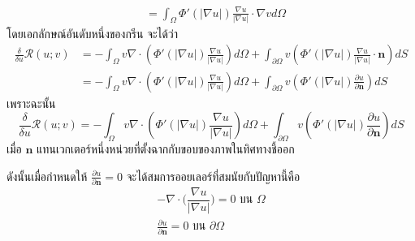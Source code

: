 \begin{Example}
\begin{align*}
    &= \int_{\Omega}\Phi'(|\nabla u|) \frac{\nabla u}{|\nabla u|} \cdot \nabla v d\Omega
    \end{align*}
    โดยเอกลักษณ์อันดับหนึ่งของกรีน จะได้ว่า
    \begin{align*}
    \frac{\delta}{\delta u}\mathcal{R}(u;v) &= - \int_{\Omega}^{} v \nabla \cdot \left(\Phi'(|\nabla u|) \frac{\nabla u}{|\nabla u|} \right)d\Omega + \int_{\partial \Omega}^{} v \left(\Phi'(|\nabla u|) \frac{\nabla u}{|\nabla u|} \cdot \boldsymbol{n}\right) dS \\
    &= -\int_{\Omega}^{} v \nabla \cdot \left(\Phi'(|\nabla u|) \frac{\nabla u}{|\nabla u|} \right)d\Omega + \int_{\partial \Omega}^{} v \left(\Phi'(|\nabla u|)  \frac{\partial u}{\partial \boldsymbol{n}}\right) dS
    \end{align*}
    เพราะฉะนั้น  
    \[
    \frac{\delta}{\delta u}\mathcal{R}(u;v) = -\int_{\Omega}^{} v \nabla \cdot \left(\Phi'(|\nabla u|) \frac{\nabla u}{|\nabla u|} \right)d\Omega + \int_{\partial \Omega}^{} v \left(\Phi'(|\nabla u|)  \frac{\partial u}{\partial \boldsymbol{n}}\right) dS
    \]
    เมื่อ $  \boldsymbol{n} $ แทนเวกเตอร์หนึ่งหน่วยที่ตั้งฉากกับขอบของภาพในทิศทางชี้ออก

    ดังนั้นเมื่อกำหนดให้ $\frac{\partial u}{\partial \boldsymbol{n}} = 0$ จะได้สมการออยเลอร์ที่สมนัยกับปัญหานี้คือ
    \begin{align*}
        - \nabla \cdot  \Big( \dfrac{\nabla u}{|\nabla u|} \Big) = 0 \text{ บน } \Omega \\
        \frac{ \partial  u }{ \partial \boldsymbol{n}} = 0 \text{ บน } \partial \Omega
    \end{align*}
\end{Example}